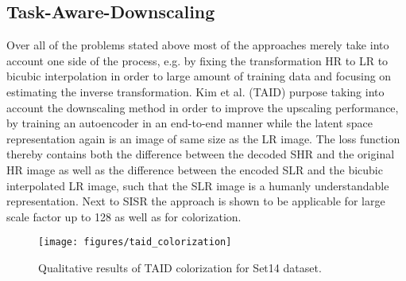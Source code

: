 \subsection{Task-Aware-Downscaling}
Over all of the problems stated above most of the approaches merely take into
account one side of the process, e.g. by fixing the transformation HR to LR
to bicubic interpolation in order to large amount of training data and focusing
on estimating the inverse transformation. Kim et al. \cite{TAID} (TAID) purpose taking
into account the downscaling method in order to improve the upscaling performance,
by training an autoencoder in an end-to-end manner while the latent space
representation again is an image of same size as the LR image. The loss function
thereby contains both the difference between the decoded SHR and the original HR
image as well as the difference between the encoded SLR and the bicubic
interpolated LR image, such that the SLR image is a humanly understandable
representation. Next to SISR the approach is shown to be applicable for large
scale factor up to 128 as well as for colorization.

\begin{figure}[!htbp]
	\centering
	\texttt{[image: figures/taid\_colorization]}
	\caption{Qualitative results of TAID colorization for Set14 dataset.}
  \label{fig:taid_colorization}
\end{figure}

%
